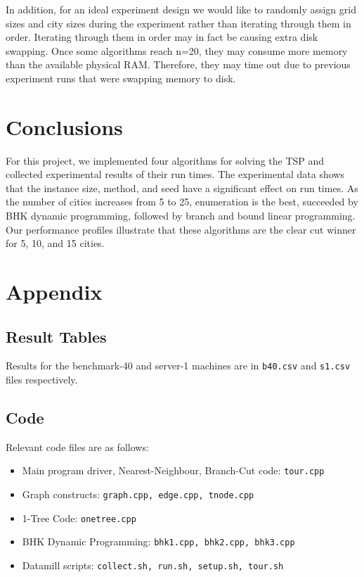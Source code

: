 \documentclass[11pt]{article}
\begin{document}
	In addition, for an ideal experiment design we would like to randomly assign grid sizes and city sizes during the experiment rather than iterating through them in order. Iterating through them in order may in fact be causing extra disk swapping. Once some algorithms reach n=20, they may consume more memory than the available physical RAM. Therefore, they may time out due to previous experiment runs that were swapping memory to disk. 
	
	\section{Conclusions}
	\label{sec:conclusions}
	For this project, we implemented four algorithms for solving the TSP and collected experimental results of their run times. The experimental data shows that the instance size, method, and seed have a significant effect on run times. As the number of cities increases from 5 to 25, enumeration is the best, succeeded by BHK dynamic programming, followed by branch and bound linear programming. Our performance profiles illustrate that these algorithms are the clear cut winner for 5, 10, and 15 cities. 
	
	
	\nocite{*}
	
	
	
	\section*{Appendix}
	\subsection*{Result Tables}

	Results for the benchmark-40 and server-1 machines are in \texttt{b40.csv} and \texttt{s1.csv} files respectively.	
	
	\subsection*{Code}
	Relevant code files are as follows:
	
	\begin{itemize}
		\item Main program driver, Nearest-Neighbour, Branch-Cut code: \texttt{tour.cpp}
		\item Graph constructs: \texttt{graph.cpp, edge.cpp, tnode.cpp}
		\item 1-Tree Code: \texttt{onetree.cpp}
		\item BHK Dynamic Programming: \texttt{bhk1.cpp, bhk2.cpp, bhk3.cpp}
		\item Datamill scripts: \texttt{collect.sh, run.sh, setup.sh, tour.sh}
	\end{itemize}
	
	
	
\end{document}
